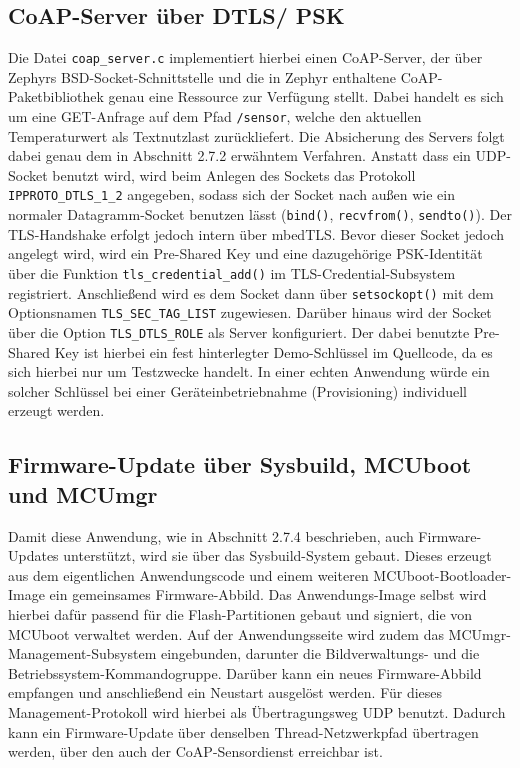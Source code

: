 \subsection{CoAP-Server über DTLS/ PSK}
Die Datei \lstinline[style=fileinline]|coap_server.c| implementiert hierbei einen CoAP-Server, der über Zephyrs BSD-Socket-Schnittstelle und die in Zephyr enthaltene CoAP-Paketbibliothek genau eine Ressource zur Verfügung stellt. Dabei handelt es sich um eine GET-Anfrage auf dem Pfad \lstinline[style=fileinline]|/sensor|, welche den aktuellen Temperaturwert als Textnutzlast zurückliefert. Die Absicherung des Servers folgt dabei genau dem in Abschnitt 2.7.2 erwähntem Verfahren. Anstatt dass ein UDP-Socket benutzt wird, wird beim Anlegen des Sockets das Protokoll \lstinline[style=fileinline]|IPPROTO_DTLS_1_2| angegeben, sodass sich der Socket nach außen wie ein normaler Datagramm-Socket benutzen lässt (\lstinline[style=fileinline]|bind()|, \lstinline[style=fileinline]|recvfrom()|, \lstinline[style=fileinline]|sendto()|). Der TLS-Handshake erfolgt jedoch intern über mbedTLS. Bevor dieser Socket jedoch angelegt wird, wird ein Pre-Shared Key und eine dazugehörige PSK-Identität über die Funktion \lstinline[style=fileinline]|tls_credential_add()| im TLS-Credential-Subsystem registriert. Anschließend wird es dem Socket dann über \lstinline[style=fileinline]|setsockopt()| mit dem Optionsnamen \lstinline[style=fileinline]|TLS_SEC_TAG_LIST| zugewiesen. Darüber hinaus wird der Socket über die Option \lstinline[style=fileinline]|TLS_DTLS_ROLE| als Server konfiguriert. Der dabei benutzte Pre-Shared Key ist hierbei ein fest hinterlegter Demo-Schlüssel im Quellcode, da es sich hierbei nur um Testzwecke handelt. In einer echten Anwendung würde ein solcher Schlüssel bei einer Geräteinbetriebnahme (Provisioning) individuell erzeugt werden.

\subsection{Firmware-Update über Sysbuild, MCUboot und MCUmgr}
Damit diese Anwendung, wie in Abschnitt 2.7.4 beschrieben, auch Firmware-Updates unterstützt, wird sie über das Sysbuild-System gebaut. Dieses erzeugt aus dem eigentlichen Anwendungscode und einem weiteren MCUboot-Bootloader-Image ein gemeinsames Firmware-Abbild. Das Anwendungs-Image selbst wird hierbei dafür passend für die Flash-Partitionen gebaut und signiert, die von MCUboot verwaltet werden. Auf der Anwendungsseite wird zudem das MCUmgr-Management-Subsystem eingebunden, darunter die Bildverwaltungs- und die Betriebssystem-Kommandogruppe. Darüber kann ein neues Firmware-Abbild empfangen und anschließend ein Neustart ausgelöst werden. Für dieses Management-Protokoll wird hierbei als Übertragungsweg UDP benutzt. Dadurch kann ein Firmware-Update über denselben Thread-Netzwerkpfad übertragen werden, über den auch der CoAP-Sensordienst erreichbar ist.
